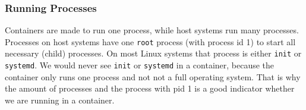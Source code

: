 \subsubsection{Running Processes}
Containers are made to run one process, while host systems run many processes. Processes on host systems have one \lstinline{root} process (with process id 1) to start all necessary (child) processes. On most Linux systems that process is either \lstinline{init} or \lstinline{systemd}. We would never see \lstinline{init} or \lstinline{systemd} in a container, because the container only runs one process and not not a full operating system. That is why the amount of processes and the process with pid 1 is a good indicator whether we are running in a container.
